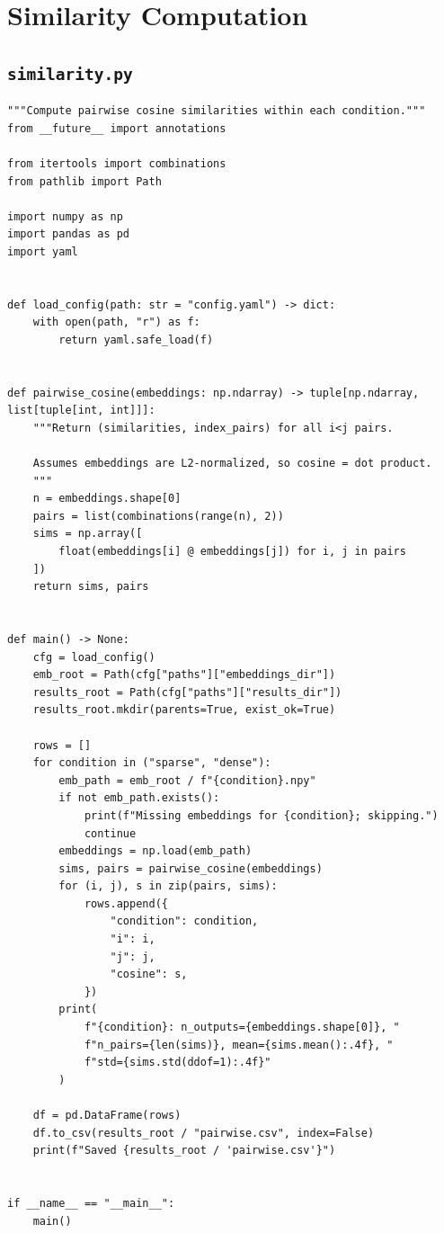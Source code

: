 \documentclass[11pt]{article}
\begin{document}
\newpage

\section{Similarity Computation}

\subsection{\texttt{similarity.py}}

\begin{lstlisting}
"""Compute pairwise cosine similarities within each condition."""
from __future__ import annotations

from itertools import combinations
from pathlib import Path

import numpy as np
import pandas as pd
import yaml


def load_config(path: str = "config.yaml") -> dict:
    with open(path, "r") as f:
        return yaml.safe_load(f)


def pairwise_cosine(embeddings: np.ndarray) -> tuple[np.ndarray, list[tuple[int, int]]]:
    """Return (similarities, index_pairs) for all i<j pairs.

    Assumes embeddings are L2-normalized, so cosine = dot product.
    """
    n = embeddings.shape[0]
    pairs = list(combinations(range(n), 2))
    sims = np.array([
        float(embeddings[i] @ embeddings[j]) for i, j in pairs
    ])
    return sims, pairs


def main() -> None:
    cfg = load_config()
    emb_root = Path(cfg["paths"]["embeddings_dir"])
    results_root = Path(cfg["paths"]["results_dir"])
    results_root.mkdir(parents=True, exist_ok=True)

    rows = []
    for condition in ("sparse", "dense"):
        emb_path = emb_root / f"{condition}.npy"
        if not emb_path.exists():
            print(f"Missing embeddings for {condition}; skipping.")
            continue
        embeddings = np.load(emb_path)
        sims, pairs = pairwise_cosine(embeddings)
        for (i, j), s in zip(pairs, sims):
            rows.append({
                "condition": condition,
                "i": i,
                "j": j,
                "cosine": s,
            })
        print(
            f"{condition}: n_outputs={embeddings.shape[0]}, "
            f"n_pairs={len(sims)}, mean={sims.mean():.4f}, "
            f"std={sims.std(ddof=1):.4f}"
        )

    df = pd.DataFrame(rows)
    df.to_csv(results_root / "pairwise.csv", index=False)
    print(f"Saved {results_root / 'pairwise.csv'}")


if __name__ == "__main__":
    main()
\end{lstlisting}
\end{document}
